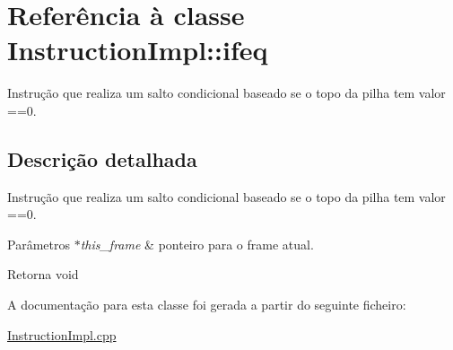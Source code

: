 \hypertarget{class_instruction_impl_1_1ifeq}{}\section{Referência à classe Instruction\+Impl\+:\+:ifeq}
\label{class_instruction_impl_1_1ifeq}


Instrução que realiza um salto condicional baseado se o topo da pilha tem valor ==0.  




\subsection{Descrição detalhada}
Instrução que realiza um salto condicional baseado se o topo da pilha tem valor ==0. 


\begin{DoxyParams}{Parâmetros}
{\em $\ast$this\+\_\+frame} & ponteiro para o frame atual. \\
\hline
\end{DoxyParams}
\begin{DoxyReturn}{Retorna}
void 
\end{DoxyReturn}


A documentação para esta classe foi gerada a partir do seguinte ficheiro\+:\begin{DoxyCompactItemize}
\item 
\hyperlink{_instruction_impl_8cpp}{Instruction\+Impl.\+cpp}\end{DoxyCompactItemize}
